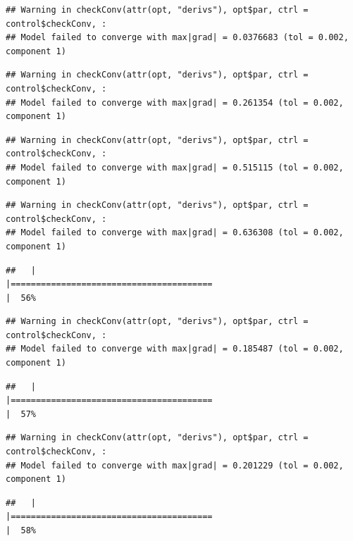 \documentclass[
  12pt,
]{book}
\begin{document}
\begin{verbatim}
## Warning in checkConv(attr(opt, "derivs"), opt$par, ctrl = control$checkConv, :
## Model failed to converge with max|grad| = 0.0376683 (tol = 0.002, component 1)
\end{verbatim}

\begin{verbatim}
## Warning in checkConv(attr(opt, "derivs"), opt$par, ctrl = control$checkConv, :
## Model failed to converge with max|grad| = 0.261354 (tol = 0.002, component 1)
\end{verbatim}

\begin{verbatim}
## Warning in checkConv(attr(opt, "derivs"), opt$par, ctrl = control$checkConv, :
## Model failed to converge with max|grad| = 0.515115 (tol = 0.002, component 1)
\end{verbatim}

\begin{verbatim}
## Warning in checkConv(attr(opt, "derivs"), opt$par, ctrl = control$checkConv, :
## Model failed to converge with max|grad| = 0.636308 (tol = 0.002, component 1)
\end{verbatim}

\begin{verbatim}
##   |                                                                              |========================================                              |  56%
\end{verbatim}

\begin{verbatim}
## Warning in checkConv(attr(opt, "derivs"), opt$par, ctrl = control$checkConv, :
## Model failed to converge with max|grad| = 0.185487 (tol = 0.002, component 1)
\end{verbatim}

\begin{verbatim}
##   |                                                                              |========================================                              |  57%
\end{verbatim}

\begin{verbatim}
## Warning in checkConv(attr(opt, "derivs"), opt$par, ctrl = control$checkConv, :
## Model failed to converge with max|grad| = 0.201229 (tol = 0.002, component 1)
\end{verbatim}

\begin{verbatim}
##   |                                                                              |========================================                              |  58%
\end{verbatim}
\end{document}
